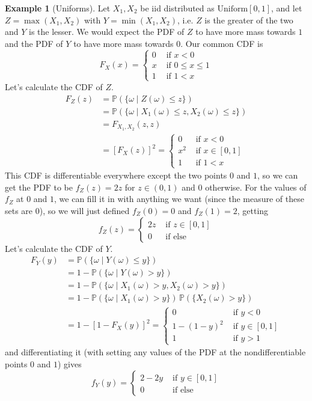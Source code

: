 \documentclass{article}
\theoremstyle{definition}
\newtheorem{example}{Example}[section]
\theoremstyle{remark}
\theoremstyle{definition}
\begin{document}
\begin{example}[Uniforms]
Let $X_1, X_2$ be iid distributed as $\mathrm{Uniform}[0, 1]$, and let $Z = \max(X_1, X_2)$ with $Y = \min(X_1, X_2)$, i.e. $Z$ is the greater of the two and $Y$ is the lesser. We would expect the PDF of $Z$ to have more mass towards $1$ and the PDF of $Y$ to have more mass towards $0$. Our common CDF is 
\[F_{X} (x) = \begin{cases} 0 & \text{ if } x < 0 \\
x & \text{ if } 0 \leq x \leq 1 \\
1 & \text{ if } 1 < x \end{cases}\]
Let's calculate the CDF of $Z$. 
\begin{align*}
    F_{Z} (z) & = \mathbb{P}(\{\omega \mid Z(\omega) \leq z\}) \\
    & = \mathbb{P}(\{ \omega \mid X_1 (\omega) \leq z, X_2 (\omega) \leq z\}) \\
    & = F_{X_1, X_2} (z, z) \\
    & = [F_{X} (z)]^2 = \begin{cases} 0 & \text{ if } x < 0 \\
x^2 & \text{ if } x \in [0, 1] \\
1 & \text{ if } 1 < x \end{cases}
\end{align*}
This CDF is differentiable everywhere except the two points $0$ and $1$, so we can get the PDF to be $f_Z (z) = 2 z$ for $z \in (0, 1)$ and $0$ otherwise. For the values of $f_Z$ at $0$ and $1$, we can fill it in with anything we want (since the measure of these sets are $0$), so we will just defined $f_Z (0) = 0$ and $f_Z(1) = 2$, getting 
\[f_Z (z) = \begin{cases} 2 z & \text{ if } z \in [0, 1] \\
0 & \text{ if else} \end{cases}\]
Let's calculate the CDF of $Y$. 
\begin{align*}
    F_{Y} (y) & = \mathbb{P}(\{ \omega \mid Y(\omega) \leq y\}) \\
    & = 1 - \mathbb{P}(\{ \omega \mid Y(\omega) > y\}) \\
    & = 1 - \mathbb{P}(\{\omega \mid X_1 (\omega) > y, X_2 (\omega) > y \}) \\
    & = 1 - \mathbb{P}(\{\omega \mid X_1 (\omega) > y\}) \, \mathbb{P}(\{ X_2 (\omega) > y \}) \\ 
    & = 1 - [1 - F_X (y)]^2 = \begin{cases} 0 & \text{ if } y < 0 \\
    1 - (1 - y)^2 & \text{ if } y \in [0, 1] \\
    1 & \text{ if } y > 1 \end{cases} 
\end{align*}
and differentiating it (with setting any values of the PDF at the nondifferentiable points $0$ and $1$) gives 
\[f_Y (y) = \begin{cases} 2 - 2y & \text{ if } y \in [0, 1] \\
0 & \text{ if else} \end{cases} \]
\end{example}
\end{document}

